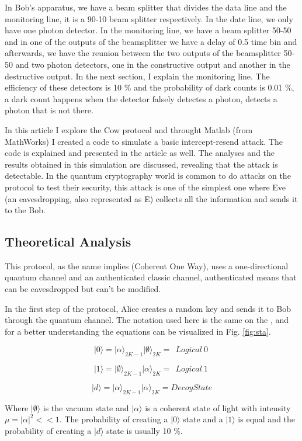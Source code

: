 \begin{refsection}
In Bob's apparatus, we have a beam splitter that divides the data line and the monitoring line, it is a 90-10 beam splitter respectively. In the date line, we only have one photon detector. In the monitoring line, we have a beam splitter 50-50 and in one of the outputs of the beamsplitter we have a delay of 0.5 time bin and afterwards, we have the reunion between the two outputs of the beamsplitter 50-50 and two photon detectors, one in the constructive output and another in the destructive output. In the next section, I explain the monitoring line. The efficiency of these detectors is 10 \% and the probability of dark counts is 0.01 \%, a dark count happens when the detector falsely detectes a photon, detects a photon that is not there.

In this article I explore the Cow protocol and throught Matlab (from MathWorks) I created a code to simulate a basic intercept-resend attack. The code is explained and presented in the article as well. The analyses and the results obtained in this simulation are discussed, revealing that the attack is detectable.  In the quantum cryptography world is common to do attacks on the protocol to test their security, this attack is one of the simplest one where Eve (an eavesdropping, also represented as E) collects all the information and sends it to the Bob.

\subsection{Theoretical Analysis}

This protocol, as the name implies (Coherent One Way), uses a one-directional quantum channel and an authenticated classic channel, authenticated means that can be eavesdropped but can't be modified.

In the first step of the protocol, Alice creates a random key and sends it to Bob through the quantum channel. The notation used here is the same on the \cite{gisin2004towards}, and for a better understanding the equations can be visualized in Fig. \ref{fig:sta}.

$$|0\rangle = |\alpha\rangle_{2K-1} |\emptyset\rangle_{2K} =\ \ Logical\ 0\ $$

$$|1\rangle = |\emptyset\rangle_{2K-1} |\alpha\rangle_{2K} =\ \ Logical\ 1\ $$

$$|d\rangle = |\alpha\rangle_{2K-1} |\alpha\rangle_{2K} = Decoy State$$

Where $|\emptyset\rangle$ is the vacuum state and $|\alpha\rangle$ is a coherent state of light with intensity $\mu=|\alpha|^2<<1$. The probability of creating a $|0\rangle$ state and a $|1\rangle$ is equal and the probability of creating a $|d\rangle$ state is usually 10 \%.


\end{refsection}
